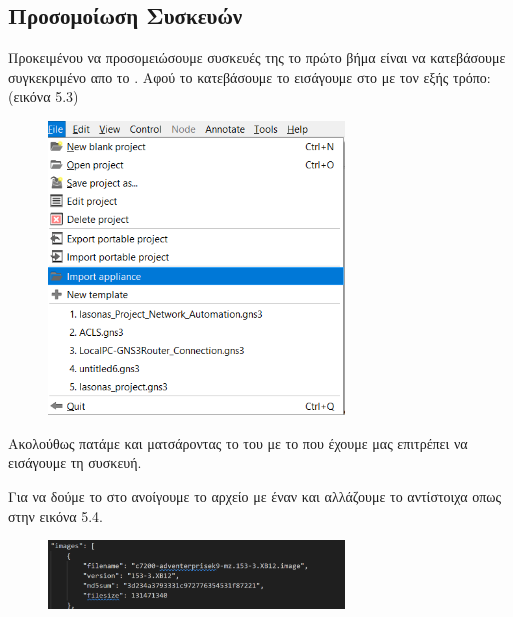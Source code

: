 \subsection{Προσομοίωση Συσκευών }

Προκειμένου να προσομειώσουμε συσκευές της  το πρώτο βήμα είναι να κατεβάσουμε συγκεκριμένο  απο το .
Αφού το κατεβάσουμε το εισάγουμε στο  με τον εξής τρόπο: (εικόνα 5.3)

\FloatBarrier

\begin{figure}[htb]
	\centering
	\includegraphics[width=0.7\textwidth]{graphics/import_appliance.png}
	\caption{ }
\end{figure}

Ακολούθως πατάμε  και ματσάροντας το  του  με το  που έχουμε μας επιτρέπει να εισάγουμε τη συσκευή.

Για να δούμε το  στο  ανοίγουμε το αρχείο με έναν  και αλλάζουμε το  αντίστοιχα οπως στην  εικόνα 5.4.

\FloatBarrier

\begin{figure}[htb]
	\centering
	\includegraphics[width=0.7\textwidth]{graphics/appliance_filename.png}
	\caption{ }
\end{figure}

